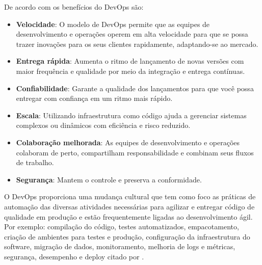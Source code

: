 De acordo com \cite{amazon} os benefícios do DevOps são:

\begin{itemize}
  \item \textbf{Velocidade}: O modelo de DevOps permite que as equipes de desenvolvimento e operações operem em alta velocidade para que se possa trazer inovações para os seus clientes rapidamente, adaptando-se ao mercado.
  \item \textbf{Entrega rápida}: Aumenta o ritmo de lançamento de novas versões com maior frequência e qualidade por meio da integração e entrega contínuas.
  \item \textbf{Confiabilidade}: Garante a qualidade dos lançamentos para que você possa entregar com confiança em um ritmo mais rápido.
  \item \textbf{Escala}: Utilizando infraestrutura como código ajuda a gerenciar sistemas complexos ou dinâmicos com eficiência e risco reduzido.
  \item \textbf{Colaboração melhorada}: As equipes de desenvolvimento e operações colaboram de perto, compartilham responsabilidade e combinam seus fluxos de trabalho.
  \item \textbf{Segurança}: Mantem o controle e preserva a conformidade.
\end{itemize}

O DevOps proporciona uma mudança cultural que tem como foco as práticas de automação das diversas atividades necessárias para agilizar e entregar código de qualidade em produção e estão frequentemente ligadas ao desenvolvimento ágil. Por exemplo: compilação do código, testes automatizados, empacotamento, criação de ambientes para testes e produção, configuração da infraestrutura do software, migração de dados, monitoramento, melhoria de logs e métricas, segurança, desempenho e deploy \cite{sato} citado por \cite{correa}.
